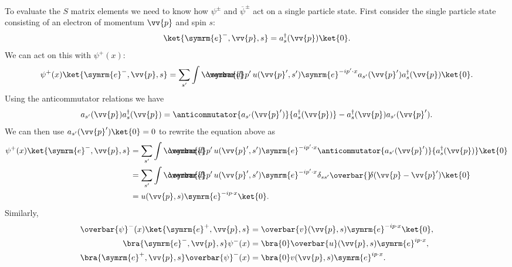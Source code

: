 \documentclass[fleqn]{NotesClass}
\newcommand{\Pe}{\ensuremath{\symrm{e}^{-}}}
\newcommand{\APe}{\ensuremath{\symrm{e}^{+}}}
\newcommand{\e}{\symrm{e}}
\newcommand{\hermit}{{\dagger}}
\newcommand{\dbar}[1][0.0]{\ThisStyle{\ensurestackMath{%
            \stackengine{#1\LMex}{\SavedStyle \symrm{d}}{\SavedStyle\overbar{}%
                \mkern2.25mu}{O}{r}{F}{F}{L}}}}
\newcommand{\invariantmeasure}[1]{%
    \mathchoice{\dbar #1}{\dbar #1}{\dbar[.05] #1}{\dbar[.06] #1}
}
\newcommand\bardelta{\ThisStyle{\ensurestackMath{%
            \stackengine{-.3\LMpt}{\SavedStyle \delta}{\SavedStyle\overbar{}%
                \mkern4.5mu}{O}{r}{F}{F}{L}}}}
\newcommand{\diracadjoint}[1]{\overbar{#1}}
\begin{document}
    To evaluate the \(S\) matrix elements we need to know how \(\psi^{\pm}\) and \(\diracadjoint{\psi}^{\pm}\) act on a single particle state.
    First consider the single particle state consisting of an electron of momentum \(\vv{p}\) and spin \(s\):
    \begin{equation}
        \ket{\Pe, \vv{p}, s} = a_s^\hermit(\vv{p}) \ket{0}.
    \end{equation}
    We can act on this with \(\psi^+(x)\):
    \begin{equation}
        \psi^+(x) \ket{\Pe, \vv{p}, s} = \sum_{s'} \int \invariantmeasure{p'} \, u(\vv{p}', s') \e^{-ip'\cdot x} a_{s'}(\vv{p}') a_{s}^\hermit(\vv{p}) \ket{0}.
    \end{equation}
    Using the anticommutator relations we have
    \begin{equation}
        a_{s'}(\vv{p}) a_{s}^\hermit(\vv{p}) = \anticommutator{a_{s'}(\vv{p}')}{a_{s}^\hermit(\vv{p})} - a_{s}^\hermit(\vv{p}) a_{s'}(\vv{p}').
    \end{equation}
    We can then use \(a_{s'}(\vv{p}') \ket{0} = 0\) to rewrite the equation above as
    \begin{align}
        \psi^+(x) \ket{\Pe, \vv{p}, s} &= \sum_{s'} \int \invariantmeasure{p'} \, u(\vv{p}', s') \e^{-ip'\cdot x} \anticommutator{a_{s'}(\vv{p}')}{a_s^\hermit(\vv{p})} \ket{0}\\
        &= \sum_{s'} \int \invariantmeasure{p'} \, u(\vv{p}', s') \e^{-ip'\cdot x} \delta_{ss'} \bardelta(\vv{p} - \vv{p}') \ket{0}\\
        &= u(\vv{p}, s) \e^{-ip\cdot x} \ket{0}.
    \end{align}
    Similarly,
    \begin{align}
        \diracadjoint{\psi}^-(x) \ket{\APe, \vv{p}, s} &= \diracadjoint{v}(\vv{p}, s) \e^{-ip\cdot x} \ket{0},\\
        \bra{\Pe, \vv{p}, s}\psi^-(x) &= \bra{0} \diracadjoint{u}(\vv{p}, s) \e^{ip\cdot x},\\
        \bra{\APe, \vv{p}, s}\diracadjoint{\psi}^-(x) &= \bra{0} v(\vv{p}, s) \e^{ip\cdot x}.
    \end{align}
    
\end{document}
